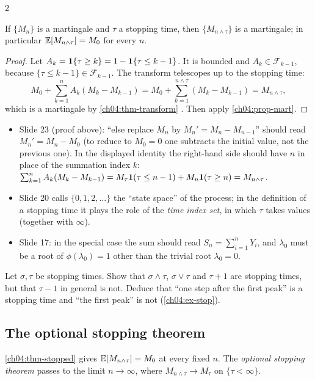 \begin{paracol}{2}
\begin{theorem}\label{ch04:thm-stopped}
If $\{M_n\}$ is a martingale and $\tau$ a stopping time, then $\{M_{n\wedge\tau}\}$ is a martingale; in
particular $\mathbb{E}[M_{n\wedge\tau}]=M_0$ for every $n$.
\end{theorem}
\begin{proof}
Let $A_k=\mathbf{1}\{\tau\ge k\}=1-\mathbf{1}\{\tau\le k-1\}$. It is bounded and $A_k\in\mathcal F_{k-1}$, because
$\{\tau\le k-1\}\in\mathcal F_{k-1}$. The transform telescopes up to the stopping time:
\[
  M_0+\sum_{k=1}^nA_k(M_k-M_{k-1})=M_0+\sum_{k=1}^{n\wedge\tau}(M_k-M_{k-1})=M_{n\wedge\tau},
\]
which is a martingale by \cref{ch04:thm-transform} . Then apply \cref{ch04:prop-mart}.
\end{proof}

\begin{coursenote}
\begin{itemize}
  \item Slide 23 (proof above): ``else replace $M_n$ by $M_n'=M_n-M_{n-1}$'' should read $M_n'=M_n-M_0$ (to reduce to
        $M_0=0$ one subtracts the initial value, not the previous one). In the displayed identity the right-hand side
        should have $n$ in place of the summation index $k$:
        $\sum_{k=1}^nA_k(M_k-M_{k-1})=M_\tau\mathbf{1}(\tau\le n-1)+M_n\mathbf{1}(\tau\ge n)=M_{n\wedge\tau}$.
  \item Slide 20 calls $\{0,1,2,\dots\}$ the ``state space'' of the process; in the definition of a stopping time it
        plays the role of the \emph{time index set}, in which $\tau$ takes values (together with $\infty$).
  \item Slide 17: in the special case the sum should read $S_n=\sum_{i=1}^nY_i$, and $\lambda_0$ must be a root of
        $\phi(\lambda_0)=1$ other than the trivial root $\lambda_0=0$.
\end{itemize}
\end{coursenote}

\begin{exercise}
Let $\sigma,\tau$ be stopping times. Show that $\sigma\wedge\tau$, $\sigma\vee\tau$ and $\tau+1$ are stopping times, but that
$\tau-1$ in general is not. Deduce that ``one step after the first peak'' is a stopping time and ``the first peak'' is
not (\cref{ch04:ex-stop}).
\end{exercise}

\subsection{The optional stopping theorem}
\cref{ch04:thm-stopped} gives $\mathbb{E}[M_{n\wedge\tau}]=M_0$ at every fixed $n$. The \emph{optional stopping theorem}
passes to the limit $n\to\infty$, where $M_{n\wedge\tau}\to M_\tau$ on $\{\tau<\infty\}$.


\end{paracol}

